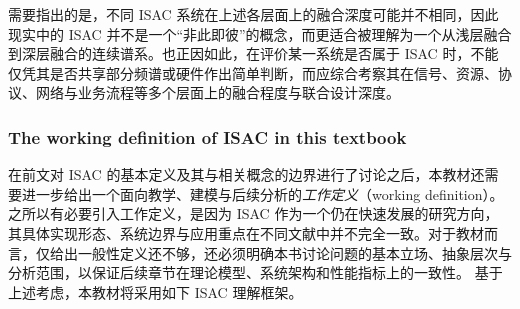 需要指出的是，不同 ISAC 系统在上述各层面上的融合深度可能并不相同，因此现实中的 ISAC 并不是一个“非此即彼”的概念，而更适合被理解为一个从浅层融合到深层融合的连续谱系。也正因如此，在评价某一系统是否属于 ISAC 时，不能仅凭其是否共享部分频谱或硬件作出简单判断，而应综合考察其在信号、资源、协议、网络与业务流程等多个层面上的融合程度与联合设计深度。

\subsubsection{The working definition of ISAC in this textbook}
\label{subsubsec:ch1-working-definition}

在前文对 ISAC 的基本定义及其与相关概念的边界进行了讨论之后，本教材还需要进一步给出一个面向教学、建模与后续分析的\emph{工作定义}（working definition）。之所以有必要引入工作定义，是因为 ISAC 作为一个仍在快速发展的研究方向，其具体实现形态、系统边界与应用重点在不同文献中并不完全一致。对于教材而言，仅给出一般性定义还不够，还必须明确本书讨论问题的基本立场、抽象层次与分析范围，以保证后续章节在理论模型、系统架构和性能指标上的一致性。
基于上述考虑，本教材将采用如下 ISAC 理解框架。

